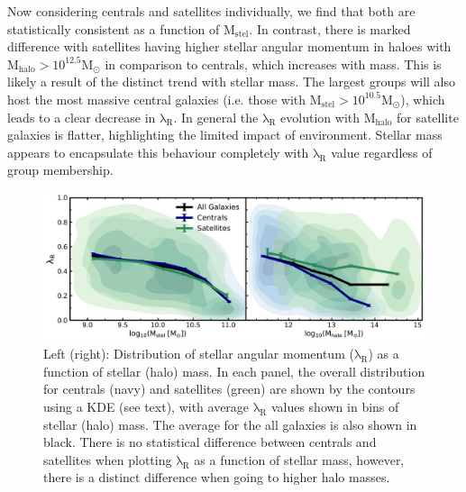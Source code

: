 Now considering centrals and satellites individually, we find that both are statistically consistent as a function of $\mathrm{M_{stel}}$. In contrast, there is marked difference with satellites having higher stellar angular momentum in haloes with $\mathrm{M_{halo} > 10^{12.5}M_{\odot}}$ in comparison to centrals, which increases with mass. This is likely a result of the distinct trend with stellar mass. The largest groups will also host the most massive central galaxies (i.e. those with $\mathrm{M_{stel} > 10^{10.5}M_{\odot}}$), which leads to a clear decrease in $\mathrm{\lambda_R}$. In general the $\mathrm{\lambda_R}$ evolution with $\mathrm{M_{halo}}$ for satellite galaxies is flatter, highlighting the limited impact of environment. Stellar mass appears to encapsulate this behaviour completely with $\mathrm{\lambda_R}$ value regardless of group membership.

\begin{figure}
    \centering\includegraphics[width=\linewidth]{thesis/latex/cw_spin/group_lambdaR_mstel_mhalo_comparison.pdf}
    \caption{Left (right): Distribution of stellar angular momentum ($\mathrm{\lambda_R}$) as a function of stellar (halo) mass. In each panel, the overall distribution for centrals (navy) and satellites (green) are shown by the contours using a KDE (see text), with average $\mathrm{\lambda_R}$ values shown in bins of stellar (halo) mass. The average for the all galaxies is also shown in black. There is no statistical difference between centrals and satellites when plotting $\mathrm{\lambda_R}$ as a function of stellar mass, however, there is a distinct difference when going to higher halo masses.}
\label{fig:group_membership_lambdaR}
\end{figure} 

